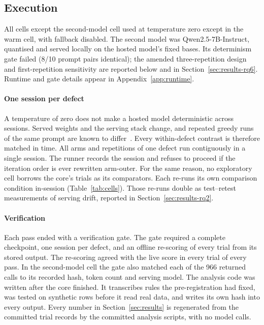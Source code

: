 \subsection{Execution}
\label{sec:design-execution}

All cells except the second-model cell used \model{} at temperature zero
except in the warm cell, with fallback disabled. The second model was
Qwen2.5-7B-Instruct, quantised and served locally on the hosted model's fixed
bases. Its determinism gate failed (8/10 prompt pairs identical); the amended
three-repetition design and first-repetition sensitivity are reported below and
in Section~\ref{sec:results-rq6}. Runtime and gate details appear in
Appendix~\ref{app:runtime}.

\paragraph{One session per defect}
A temperature of zero does not make a hosted model deterministic across
sessions. Served weights and the serving stack change, and repeated greedy
runs of the same prompt are known to differ~\citep{arimbur2026}. Every
within-defect contrast is therefore matched in time. All arms and repetitions
of one defect run contiguously in a single session. The runner records the
session and refuses to proceed if the iteration order is ever rewritten
arm-outer. For the same reason, no exploratory cell borrows the core's trials
as its comparators. Each re-runs its own comparison condition in-session
(Table~\ref{tab:cells}). Those re-runs double as test--retest measurements of
serving drift, reported in Section~\ref{sec:results-rq2}.

\paragraph{Verification}
Each pass ended with a verification gate. The gate required a complete
checkpoint, one session per defect, and an offline re-scoring of every trial
from its stored output. The re-scoring agreed with the live score in every
trial of every pass. In the second-model cell the gate also matched each of
the 966 returned calls to its recorded hash, token count and serving model.
The analysis code was written after the core finished. It
transcribes rules the pre-registration had fixed, was tested on synthetic rows
before it read real data, and writes its own hash into every output. Every
number in Section~\ref{sec:results} is regenerated from the committed trial
records by the committed analysis scripts, with no model calls.

